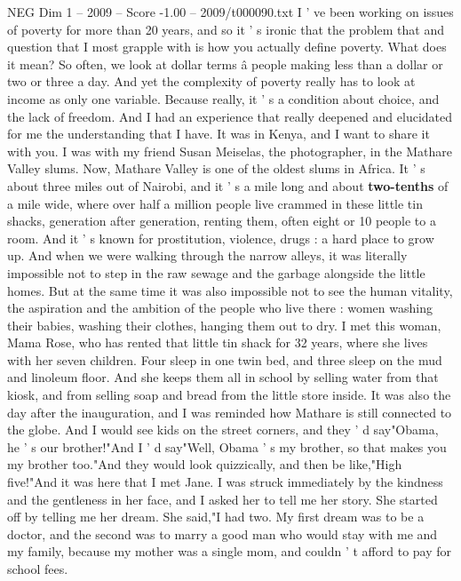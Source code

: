 \begin{textsample}{NEG Dim 1 – 2009 – Score -1.00 – 2009/t000090.txt}  \label{ex:f1_neg_050}
I ' ve been working on issues of poverty for more than 20 years, and so it ' s ironic that the problem that and question that I most grapple with is how you actually define poverty.
What does it mean?
So often, we look at dollar terms â people making less than a dollar or two or three a day.
And yet the complexity of poverty really has to look at income as only one variable.
Because really, it ' s a condition about choice, and the lack of freedom.
And I had an experience that really deepened and elucidated for me the understanding that I have.
It was in Kenya, and I want to share it with you.
I was with my friend Susan Meiselas, the photographer, in the Mathare Valley slums.
Now, Mathare Valley is one of the oldest slums in Africa.
It ' s about three miles out of Nairobi, and it ' s a mile long and about \textbf{two-tenths} of a mile wide, where over half a million people live crammed in these little tin shacks, generation after generation, renting them, often eight or 10 people to a room.
And it ' s known for prostitution, violence, drugs : a hard place to grow up.
And when we were walking through the narrow alleys, it was literally impossible not to step in the raw sewage and the garbage alongside the little homes.
But at the same time it was also impossible not to see the human vitality, the aspiration and the ambition of the people who live there : women washing their babies, washing their clothes, hanging them out to dry.
I met this woman, Mama Rose, who has rented that little tin shack for 32 years, where she lives with her seven children.
Four sleep in one twin bed, and three sleep on the mud and linoleum floor.
And she keeps them all in school by selling water from that kiosk, and from selling soap and bread from the little store inside.
It was also the day after the inauguration, and I was reminded how Mathare is still connected to the globe.
And I would see kids on the street corners, and they ' d say"Obama, he ' s our brother!"And I ' d say"Well, Obama ' s my brother, so that makes you my brother too."And they would look quizzically, and then be like,"High five!"And it was here that I met Jane.
I was struck immediately by the kindness and the gentleness in her face, and I asked her to tell me her story.
She started off by telling me her dream.
She said,"I had two.
My first dream was to be a doctor, and the second was to marry a good man who would stay with me and my family, because my mother was a single mom, and couldn ' t afford to pay for school fees.

\end{textsample}
